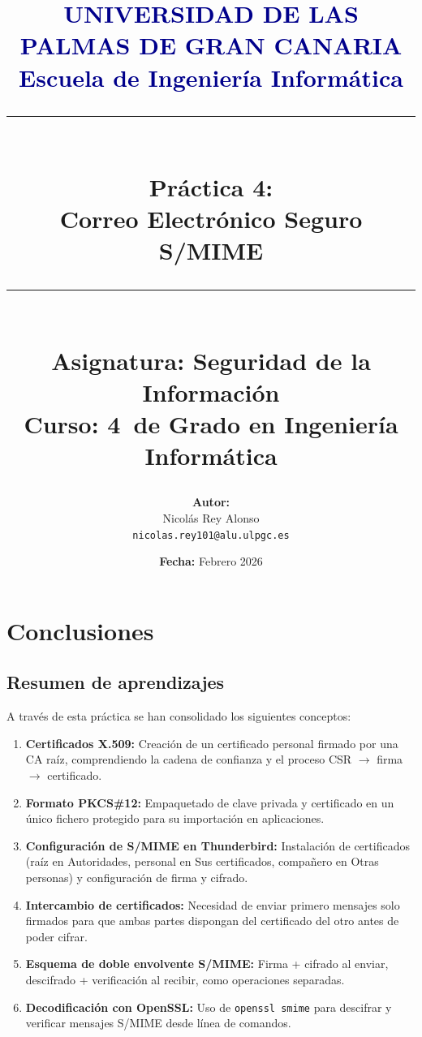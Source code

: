 \documentclass[12pt,a4paper]{report}
\title{
    \vspace*{-2cm}
    {\Large \textcolor{darkblue}{\textbf{UNIVERSIDAD DE LAS PALMAS DE GRAN CANARIA}}}\\
    {\Large \textcolor{darkblue}{\textbf{Escuela de Ingeniería Informática}}}\\
    \vspace{1cm}
    {\rule{\textwidth}{2pt}}\\
    \vspace{0.5cm}
    {\LARGE \textbf{Práctica 4:}}\\
    {\LARGE \textbf{Correo Electrónico Seguro S/MIME}}\\
    \vspace{0.5cm}
    {\rule{\textwidth}{2pt}}\\
    \vspace{1cm}
    {\large \textbf{Asignatura:} Seguridad de la Información}\\
    {\large \textbf{Curso:} 4\textdegree\ de Grado en Ingeniería Informática}\\
    \vspace{1.5cm}
}
\author{
    \textbf{Autor:} \\
    Nicolás Rey Alonso\\
    \texttt{nicolas.rey101@alu.ulpgc.es}\\
}
\date{
    \vspace{1cm}
    \textbf{Fecha:} Febrero 2026
}
\begin{document}
\maketitle
\thispagestyle{firststyle}









\chapter{Conclusiones}

\section{Resumen de aprendizajes}

A través de esta práctica se han consolidado los siguientes conceptos:

\begin{enumerate}
    \item \textbf{Certificados X.509:} Creación de un certificado personal firmado por una CA raíz, comprendiendo la cadena de confianza y el proceso CSR $\rightarrow$ firma $\rightarrow$ certificado.
    \item \textbf{Formato PKCS\#12:} Empaquetado de clave privada y certificado en un único fichero protegido para su importación en aplicaciones.
    \item \textbf{Configuración de S/MIME en Thunderbird:} Instalación de certificados (raíz en Autoridades, personal en Sus certificados, compañero en Otras personas) y configuración de firma y cifrado.
    \item \textbf{Intercambio de certificados:} Necesidad de enviar primero mensajes solo firmados para que ambas partes dispongan del certificado del otro antes de poder cifrar.
    \item \textbf{Esquema de doble envolvente S/MIME:} Firma + cifrado al enviar, descifrado + verificación al recibir, como operaciones separadas.
    \item \textbf{Decodificación con OpenSSL:} Uso de \texttt{openssl smime} para descifrar y verificar mensajes S/MIME desde línea de comandos.
\end{enumerate}
\end{document}
